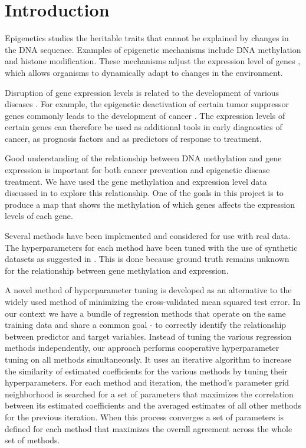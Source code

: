 \chapter{Introduction}
Epigenetics \cite{holliday2006epigenetics} studies the heritable traits that cannot be explained by changes in the DNA sequence. Examples of epigenetic mechanisms include DNA methylation and histone modification. These mechanisms adjust the expression level of genes \cite{jaenisch2003epigenetic}, which allows organisms to dynamically adapt to changes in the environment.

Disruption of gene expression levels is related to the development of various diseases \cite{egger2004epigenetics}. For example, the epigenetic deactivation of certain tumor suppressor genes commonly leads to the development of cancer \cite{esteller2008epigenetics}. The expression levels of certain genes can therefore be used as additional tools in early diagnostics of cancer, as prognosis factors and as predictors of response to treatment.

Good understanding of the relationship between DNA methylation and gene expression is important for both cancer prevention and epigenetic disease treatment. We have used the gene methylation and expression level data discussed in \cite{cancer2012comprehensive} to explore this relationship. One of the goals in this project is to produce a map that shows the methylation of which genes affects the expression levels of each gene.

Several methods \cite{tibshirani1996regression,zou2005regularization,li2008network,li2010variable,pan2010incorporating,luo2012two,kim2013network} have been implemented and considered for use with real data. The hyperparameters for each method have been tuned with the use of synthetic datasets as suggested in \cite{li2008network}. This is done because ground truth remains unknown for the relationship between gene methylation and expression.

A novel method of hyperparameter tuning is developed as an alternative to the widely used method of minimizing the cross-validated mean squared test error. In our context we have a bundle of regression methods that operate on the same training data and share a common goal - to correctly identify the relationship between predictor and target variables. Instead of tuning the various regression methods independently, our approach performs cooperative hyperparameter tuning on all methods simultaneously. It uses an iterative algorithm to increase the similarity of estimated coefficients for the various methods by tuning their hyperparameters. For each method and iteration, the method's parameter grid neighborhood is searched for a set of parameters that maximizes the correlation between its estimated coefficients and the averaged estimates of all other methods for the previous iteration. When this process converges a set of parameters is defined for each method that maximizes the overall agreement across the whole set of methods.


